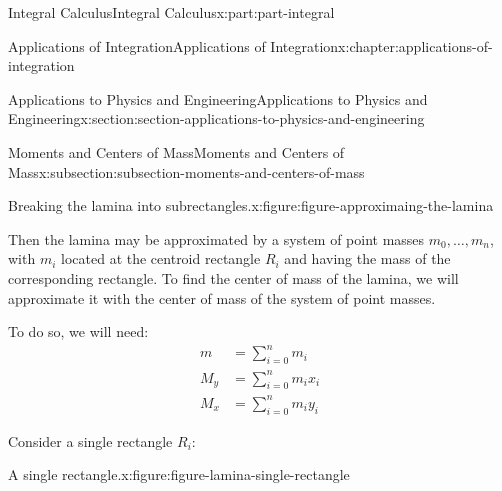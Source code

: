 \documentclass[twoside,10pt,]{tufte-book}
\numberwithin{equation}{part}
\newcommand{\amp}{&}
\begin{document}
\begin{partptx}{Integral Calculus}{}{Integral Calculus}{}{}{x:part:part-integral}
\begin{chapterptx}{Applications of Integration}{}{Applications of Integration}{}{}{x:chapter:applications-of-integration}
\begin{sectionptx}{Applications to Physics and Engineering}{}{Applications to Physics and Engineering}{}{}{x:section:section-applications-to-physics-and-engineering}
\begin{subsectionptx}{Moments and Centers of Mass}{}{Moments and Centers of Mass}{}{}{x:subsection:subsection-moments-and-centers-of-mass}
\begin{figureptx}{Breaking the lamina into subrectangles.}{x:figure:figure-approximaing-the-lamina}{}
\begin{image}{0}{1}{0}
{
}%
\end{image}%
\tcblower
\end{figureptx}%
Then the lamina may be approximated by a system of point masses \(m_{0},\ldots,m_{n}\), with \(m_{i}\) located at the centroid rectangle \(R_{i}\) and having the mass of the corresponding rectangle. To find the center of mass of the lamina, we will approximate it with the center of mass of the system of point masses.%
\par
To do so, we will need:%
\begin{align*}
m \amp= \sum_{i=0}^{n}m_{i}\\
M_{y} \amp= \sum_{i=0}^{n}m_{i}x_{i}\\
M_{x} \amp= \sum_{i=0}^{n}m_{i}y_{i}
\end{align*}
%
\par
Consider a single rectangle \(R_{i}\):%
\begin{figureptx}{A single rectangle.}{x:figure:figure-lamina-single-rectangle}{}%
\begin{image}{0}{1}{0}%
\end{image}
\end{figureptx}
\end{subsectionptx}
\end{sectionptx}
\end{chapterptx}
\end{partptx}
\end{document}
